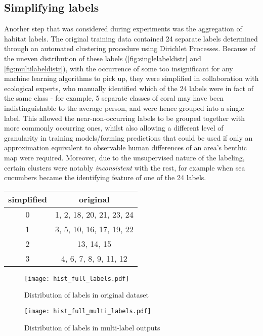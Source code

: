 \subsection{Simplifying labels}
Another step that was considered during experiments was the aggregation of habitat labels. The original training data contained 24 separate labels determined through an automated clustering procedure using Dirichlet Processes. Because of the uneven distribution of these labels (\autoref{fig:singlelabeldistr} and \autoref{fig:multilabeldistr}), with the occurrence of some too insignificant for any machine learning algorithms to pick up, they were simplified in collaboration with ecological experts, who manually identified which of the 24 labels were in fact of the same class - for example, 5 separate classes of coral may have been indistinguishable to the average person, and were hence grouped into a single label. This allowed the near-non-occurring labels to be grouped together with more commonly occurring ones, whilst also allowing a different level of granularity in training models/forming predictions that could be used if only an approximation equivalent to observable human differences of an area's benthic map were required. Moreover, due to the unsupervised nature of the labeling, certain clusters were notably \textit{inconsistent} with the rest, for example when sea cucumbers became the identifying feature of one of the 24 labels.


\begin{tabular}{|c| c|}
    \hline
    simplified & original \\\hline
    0 & 1, 2, 18, 20, 21, 23, 24 \\
    1 & 3, 5, 10, 16, 17, 19, 22\\
    2 & 13, 14, 15 \\
    3 & 4, 6, 7, 8, 9, 11, 12 \\
    \hline
\end{tabular}


\begin{figure}[H]
    \begin{minipage}{.49\linewidth}
        \texttt{[image: hist\_full\_labels.pdf]}
        \caption{Distribution of labels in original dataset}
        \label{fig:singlelabeldistr}
    \end{minipage}
    \hfill
    \begin{minipage}{.49\linewidth}
        \texttt{[image: hist\_full\_multi\_labels.pdf]}
        \caption{Distribution of labels in multi-label outputs}
        \label{fig:multilabeldistr}
    \end{minipage}
\end{figure}

